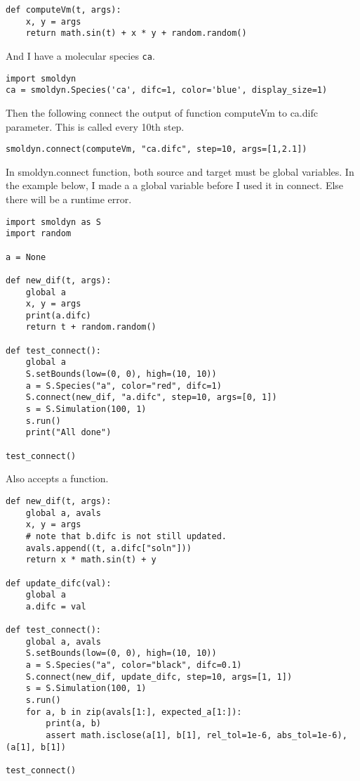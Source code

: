 \documentclass {book}
\newcommand {\ttt} {\texttt}
\begin{document}
\begin{verbatim}
def computeVm(t, args):
    x, y = args 
    return math.sin(t) + x * y + random.random()
\end{verbatim}

And I have a molecular species \ttt{ca}.

\begin{verbatim}
import smoldyn
ca = smoldyn.Species('ca', difc=1, color='blue', display_size=1)
\end{verbatim}
Then the following connect the output of function computeVm to ca.difc parameter. This is called every 10th step.

\begin{verbatim}
smoldyn.connect(computeVm, "ca.difc", step=10, args=[1,2.1])
\end{verbatim}

In smoldyn.connect function, both source and target must be global variables. In the example below, I made a a global variable before I used it in connect. Else there will be a runtime error.

\begin{verbatim}
import smoldyn as S
import random

a = None

def new_dif(t, args):
    global a
    x, y = args
    print(a.difc)
    return t + random.random()

def test_connect():
    global a
    S.setBounds(low=(0, 0), high=(10, 10))
    a = S.Species("a", color="red", difc=1)
    S.connect(new_dif, "a.difc", step=10, args=[0, 1])
    s = S.Simulation(100, 1)
    s.run()
    print("All done")

test_connect()
\end{verbatim}

Also accepts a function.

\begin{verbatim}
def new_dif(t, args):
    global a, avals
    x, y = args
    # note that b.difc is not still updated.
    avals.append((t, a.difc["soln"]))
    return x * math.sin(t) + y

def update_difc(val):
    global a
    a.difc = val

def test_connect():
    global a, avals
    S.setBounds(low=(0, 0), high=(10, 10))
    a = S.Species("a", color="black", difc=0.1)
    S.connect(new_dif, update_difc, step=10, args=[1, 1])
    s = S.Simulation(100, 1)
    s.run()
    for a, b in zip(avals[1:], expected_a[1:]):
        print(a, b)
        assert math.isclose(a[1], b[1], rel_tol=1e-6, abs_tol=1e-6), (a[1], b[1])

test_connect()
\end{verbatim}
\end{document}
